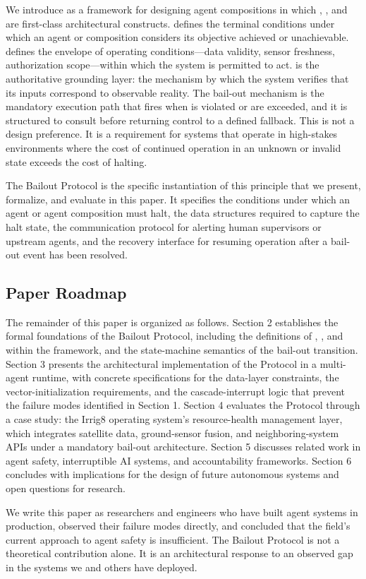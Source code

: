 We introduce \bxthree as a framework for designing agent compositions in which \purpose, \bounds, and \fact are first-class architectural constructs. \Purpose defines the terminal conditions under which an agent or composition considers its objective achieved or unachievable. \Bounds defines the envelope of operating conditions—data validity, sensor freshness, authorization scope—within which the system is permitted to act. \Fact is the authoritative grounding layer: the mechanism by which the system verifies that its inputs correspond to observable reality. The bail-out mechanism is the mandatory execution path that fires when \purpose is violated or \bounds are exceeded, and it is structured to consult \fact before returning control to a defined fallback. This is not a design preference. It is a requirement for systems that operate in high-stakes environments where the cost of continued operation in an unknown or invalid state exceeds the cost of halting.

The Bailout Protocol is the specific instantiation of this principle that we present, formalize, and evaluate in this paper. It specifies the conditions under which an agent or agent composition must halt, the data structures required to capture the halt state, the communication protocol for alerting human supervisors or upstream agents, and the recovery interface for resuming operation after a bail-out event has been resolved.

\subsection*{Paper Roadmap}

The remainder of this paper is organized as follows. Section 2 establishes the formal foundations of the Bailout Protocol, including the definitions of \purpose, \bounds, and \fact within the \bxthree framework, and the state-machine semantics of the bail-out transition. Section 3 presents the architectural implementation of the Protocol in a multi-agent runtime, with concrete specifications for the data-layer constraints, the vector-initialization requirements, and the cascade-interrupt logic that prevent the failure modes identified in Section 1. Section 4 evaluates the Protocol through a case study: the Irrig8 operating system's resource-health management layer, which integrates satellite data, ground-sensor fusion, and neighboring-system APIs under a mandatory bail-out architecture. Section 5 discusses related work in agent safety, interruptible AI systems, and accountability frameworks. Section 6 concludes with implications for the design of future autonomous systems and open questions for research.

We write this paper as researchers and engineers who have built agent systems in production, observed their failure modes directly, and concluded that the field's current approach to agent safety is insufficient. The Bailout Protocol is not a theoretical contribution alone. It is an architectural response to an observed gap in the systems we and others have deployed.
